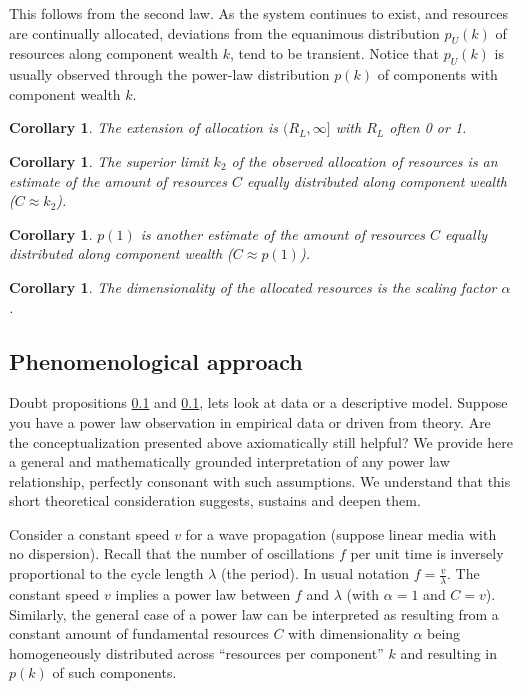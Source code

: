 \documentclass[a4paper, 11pt]{article} %
\newtheorem{corollary}[theorem]{Corollary}
\begin{document}
This follows from the second law. As the system continues to exist,
and resources are continually allocated, deviations from the equanimous
distribution $p_U(k)$ of resources along component wealth $k$,
 tend to be transient.
 Notice that $p_U(k)$ is usually observed through 
 the power-law distribution $p(k)$ of components
with component wealth $k$.

\begin{corollary}
The extension of allocation is $(R_L,\infty]$ with $R_L$ often 0 or 1.
\end{corollary}


\begin{corollary}
	The superior limit $k_2$ of the observed allocation of resources is an estimate of the amount of resources $C$ equally distributed along component wealth ($C\approx k_2$).
\end{corollary}

\begin{corollary}
	$p(1)$ is another estimate of the amount of resources $C$ equally distributed along component wealth ($C\approx p(1)$).
\end{corollary}

\begin{corollary}
	The dimensionality of the allocated resources is the scaling factor $\alpha$.
\end{corollary}

\subsection{Phenomenological approach}

Doubt propositions \ref{} and \ref{}, lets look at data
or a descriptive model.
Suppose you have a power law observation in empirical data
or driven from theory.
Are the conceptualization
presented above axiomatically still helpful?
We provide here a general and mathematically grounded
interpretation of any power law relationship,
perfectly consonant with such assumptions.
We understand that this short theoretical consideration
suggests, sustains and deepen them.

Consider a constant speed $v$ for a wave propagation
(suppose linear media with no dispersion).
Recall that the number of oscillations $f$ per unit time is
inversely proportional to the cycle length $\lambda$ (the period).
In usual notation $f=\frac{v}{\lambda}$.
The constant speed $v$ implies a power law between 
$f$ and $\lambda$ (with $\alpha=1$ and $C=v$).
Similarly, the general case of a power law can
be interpreted as resulting from a constant amount of
fundamental resources $C$ with dimensionality $\alpha$ 
being homogeneously distributed across
``resources per component'' $k$ and 
resulting in $p(k)$ of such components.
\end{document}
